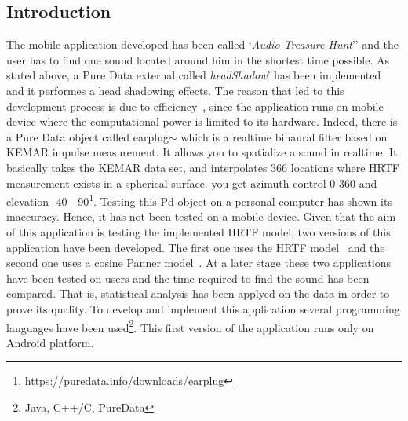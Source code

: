 \documentclass[journal]{IEEEtran}
\begin{document}
\subsection{Introduction}
The mobile application developed has been called `\emph{Audio Treasure Hunt}'' and the user has to find one sound located around him in the shortest time possible. As stated above, a Pure Data external called \textit{headShadow}' has been implemented and it performes a head shadowing effects. The reason that led to this development process is due to efficiency~\cite{aroundMe}, since the application runs on mobile device where the computational power is limited to its hardware. Indeed, there is a Pure Data object called earplug$\sim$ which is a realtime binaural filter based on KEMAR impulse measurement. It allows you to spatialize a sound in realtime. It basically takes the KEMAR data set, and interpolates 366 locations where HRTF measurement exists in a spherical surface. you get azimuth control 0-360 and elevation -40 - 90\footnote{https://puredata.info/downloads/earplug}. Testing this Pd object on a personal computer has shown its inaccuracy. Hence, it has not been tested on a mobile device. 
Given that the aim of this application is testing the implemented HRTF model, two versions of this application have been developed. The first one uses the HRTF model~\cite{Brown1997} and the second one uses a cosine Panner model~\cite{AndyFarnell2010}.
At a later stage these two applications have been tested on users and the time required to find the sound has been compared. That is, statistical analysis has been applyed on the data in order to prove its quality. To develop and implement this application several programming languages have been used\footnote{Java, C++/C, PureData}. This first version of the application runs only on Android platform.


\end{document}
